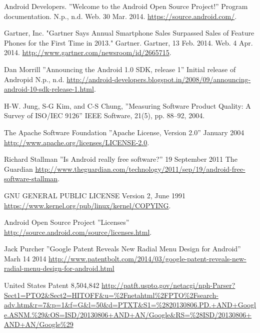 \documentclass[conference]{IEEEtran}
\begin{document}
\begin{thebibliography}{1}


Android Developers. ''Welcome to the Android Open Source Project!'' Program documentation. N.p., n.d. Web. 30 Mar. 2014. \url{https://source.android.com/}.

Gartner, Inc. "Gartner Says Annual Smartphone Sales Surpassed Sales of Feature Phones for the First Time in 2013." Gartner. Gartner, 13 Feb. 2014. Web. 4 Apr. 2014. \url{http://www.gartner.com/newsroom/id/2665715}.

Dan Morrill ''Announcing the Android 1.0 SDK, release 1'' Initial release of Andropid N.p., n.d. \url{http://android-developers.blogspot.in/2008/09/announcing-android-10-sdk-release-1.html}.

H-W. Jung, S-G Kim, and C-S Chung, ''Measuring Software Product Quality: A Survey of ISO/IEC 9126'' IEEE Software, 21(5), pp. 88--92, 2004.

The Apache Software Foundation ''Apache License, Version 2.0'' January 2004 \url{http://www.apache.org/licenses/LICENSE-2.0}.

Richard Stallman ''Is Android really free software?'' 19 September 2011 The Guardian \url{http://www.theguardian.com/technology/2011/sep/19/android-free-software-stallman}.

GNU GENERAL PUBLIC LICENSE Version 2, June 1991 \url{https://www.kernel.org/pub/linux/kernel/COPYING}.

Android Open Source Project ''Licenses'' \url{http://source.android.com/source/licenses.html}.

Jack Purcher ''Google Patent Reveals New Radial Menu Design for Android'' Marh 14 2014 \url{http://www.patentbolt.com/2014/03/google-patent-reveals-new-radial-menu-design-for-android.html}

United States Patent 8,504,842 \url{http://patft.uspto.gov/netacgi/nph-Parser?Sect1=PTO2&Sect2=HITOFF&u=\%2Fnetahtml\%2FPTO\%2Fsearch-adv.htm&r=7&p=1&f=G&l=50&d=PTXT&S1=\%2820130806.PD.+AND+Google.ASNM.\%29&OS=ISD/20130806+AND+AN/Google&RS=\%28ISD/20130806+AND+AN/Google\%29}


\end{thebibliography}
\end{document}
